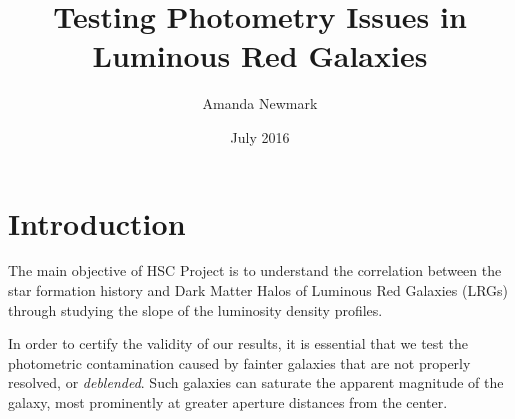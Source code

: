 \documentclass{article}
\title{Testing Photometry Issues in Luminous Red Galaxies}
\author{Amanda Newmark}
\date{July 2016}
\begin{document}
\tableofcontents{}
\begin{titlepage}
\maketitle
\end{titlepage}

\section{Introduction}

The main objective of HSC Project is to understand the correlation between the star formation history and Dark Matter Halos of Luminous Red Galaxies (LRGs) through studying the slope of the luminosity density profiles.

In order to certify the validity of our results, it is essential that we test the photometric contamination caused by fainter galaxies that are not properly resolved, or \textit{deblended}. Such galaxies can saturate the apparent magnitude of the galaxy, most prominently at greater aperture distances from the center.
\end{document}
